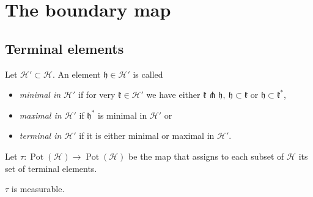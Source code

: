 \section{The boundary map}
\label{sec:map}

\subsection{Terminal elements}
\label{sec:treminal-elements}

\begin{defin}
  Let \(\mathcal{H}' \subset \mathcal{H}\). An element \(\mathfrak{h} \in \mathcal{H}'\) is called
  \begin{itemize}
  \item \emph{minimal in \(\mathcal{H}'\)} if for very \(\mathfrak{k} \in \mathcal{H'}\) we have either \(\mathfrak{k} \pitchfork \mathfrak{h},\ \mathfrak{h} \subset \mathfrak{k}\) or \(\mathfrak{h} \subset \mathfrak{k}^\ast\),
  \item \emph{maximal in \(\mathcal{H}'\)} if \(\mathfrak{h}^\ast\) is minimal in \(\mathcal{H}'\) or
  \item \emph{terminal in \(\mathcal{H}'\)} if it is either minimal or maximal in \(\mathcal{H}'\).
  \end{itemize}
  Let \(\tau\colon \operatorname{Pot}(\mathcal{H}) \to \operatorname{Pot}(\mathcal{H})\) be the map that assigns to each subset of \(\mathcal{H}\) its set of terminal elements.
\end{defin}

\begin{lemma}
  \label{lem:tau}
  \(\tau\) is measurable.
\end{lemma}

